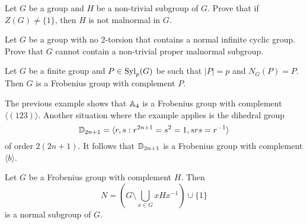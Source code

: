 \begin{exercise}
\label{xca:malnormal_center}
    Let $G$ be a group and $H$ be a non-trivial
    subgroup of $G$. Prove that if $Z(G)\ne\{1\}$, then
    $H$ is not malnormal in $G$. 
\end{exercise}

\begin{bonus}
\label{xca:malnormal_no2torsion}
    Let $G$ be a group with no 2-torsion 
    that contains a normal infinite cyclic group. Prove 
    that $G$ cannot contain a non-trivial proper malnormal subgroup. 
\end{bonus}


\begin{example}
    Let $G$ be a finite group 
    and $P\in\mathrm{Syl}_p(G)$ be such that $|P|=p$ and $N_G(P)=P$. Then $G$ is a Frobenius group
    with complement $P$. 
\end{example}

The previous example shows that 
$\mathbb{A}_4$ is a Frobenius group
with complement $\langle(123)\rangle$. Another situation
where the example applies is the dihedral
group 
\[
\mathbb{D}_{2n+1}=\langle r,s:r^{2n+1}=s^2=1,srs=r^{-1}\rangle
\]
of order $2(2n+1)$. It follows that
$\mathbb{D}_{2n+1}$ is a Frobenius
group with complement $\langle b\rangle$. 

\begin{theorem}[Frobenius]
  \label{thm:Frobenius}
  Let $G$ be a Frobenius group with complement $H$. Then
  \[
	N=\left( G\setminus\bigcup_{x\in G}xHx^{-1}\right)\cup\{1\}
  \]
  is a normal subgroup of $G$.
\end{theorem}

